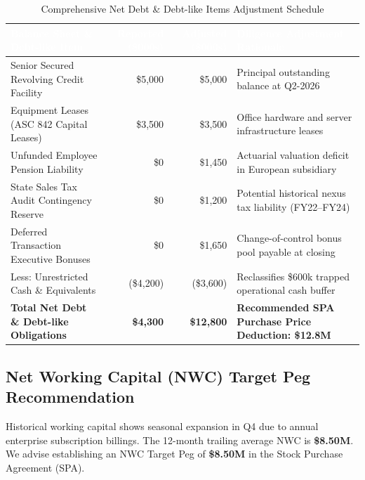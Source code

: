 \documentclass[10pt,a4paper,oneside]{scrreprt}
\newcommand{\tablehdr}[1]{\fontseries{b}\selectfont\textcolor{white}{#1}}
\begin{document}
\begin{table}[H]
\centering
\fontsize{8.2}{10}\selectfont
\renewcommand{\arraystretch}{1.0}
\begin{tabularx}{\textwidth}{L r r L}
\hline
{}
\tablehdr{Balance Sheet \& Debt-like Item} & \tablehdr{Reported (\$000s)} & \tablehdr{Adjusted (\$000s)} & \tablehdr{Diligence Adjustment Rationale} \\
\hline
Senior Secured Revolving Credit Facility & \$5,000 & \$5,000 & Principal outstanding balance at Q2-2026 \\
Equipment Leases (ASC 842 Capital Leases) & \$3,500 & \$3,500 & Office hardware and server infrastructure leases \\
Unfunded Employee Pension Liability & \$0 & \$1,450 & Actuarial valuation deficit in European subsidiary \\
State Sales Tax Audit Contingency Reserve & \$0 & \$1,200 & Potential historical nexus tax liability (FY22--FY24) \\
Deferred Transaction Executive Bonuses & \$0 & \$1,650 & Change-of-control bonus pool payable at closing \\
Less: Unrestricted Cash \& Equivalents & (\$4,200) & (\$3,600) & Reclassifies \$600k trapped operational cash buffer \\
\hline
{}
\textbf{Total Net Debt \& Debt-like Obligations} & \textbf{\$4,300} & \textbf{\$12,800} & \textbf{Recommended SPA Purchase Price Deduction: \$12.8M} \\
\hline
\end{tabularx}
\caption{Comprehensive Net Debt \& Debt-like Items Adjustment Schedule}
\end{table}

\vspace{-0.1cm}

\subsection*{Net Working Capital (NWC) Target Peg Recommendation}

Historical working capital shows seasonal expansion in Q4 due to annual enterprise subscription billings. The 12-month trailing average NWC is \textbf{\$8.50M}. We advise establishing an NWC Target Peg of \textbf{\$8.50M} in the Stock Purchase Agreement (SPA).
\end{document}
